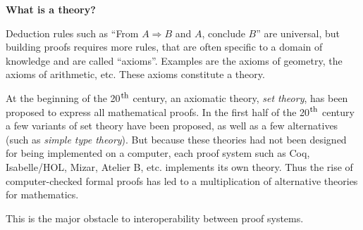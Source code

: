 \begin{framed}
\vspace*{-0.5cm}
  \begin{center}
{\bf \Large What is a theory?}
\end{center}

Deduction rules such as ``From $A \Rightarrow B$ and $A$, conclude
$B$'' are universal, but building proofs requires more rules, that are
often specific to a domain of knowledge and are called
``axioms''. Examples are the axioms of geometry, the axioms of
arithmetic, etc. These axioms constitute a theory.

At the beginning of the 20$^{\mbox{\footnotesize th}}$ century, an
axiomatic theory, {\em set theory}, has been proposed to express all
mathematical proofs. In the first half of the 20$^{\mbox{\footnotesize
    th}}$ century a few variants of set theory have been proposed, as
well as a few alternatives (such as \emph{simple type theory}).  But
because these theories had not been designed for being implemented on
a computer, each proof system such as Coq, Isabelle/HOL, Mizar,
Atelier B, etc. implements its own theory.  Thus the rise of
computer-checked formal proofs has led to a multiplication of
alternative theories for mathematics.

This is the major obstacle to interoperability between proof systems.
\end{framed}
\pagebreak

